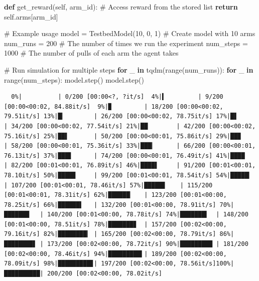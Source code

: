 \documentclass[
  letterpaper,
  DIV=11,
  numbers=noendperiod,
  oneside]{scrartcl}
\newenvironment{Shaded}{\begin{snugshade}}{\end{snugshade}}
\newcommand{\BuiltInTok}[1]{\textcolor[rgb]{0.00,0.23,0.31}{#1}}
\newcommand{\CommentTok}[1]{\textcolor[rgb]{0.37,0.37,0.37}{#1}}
\newcommand{\ControlFlowTok}[1]{\textcolor[rgb]{0.00,0.23,0.31}{\textbf{#1}}}
\newcommand{\DecValTok}[1]{\textcolor[rgb]{0.68,0.00,0.00}{#1}}
\newcommand{\KeywordTok}[1]{\textcolor[rgb]{0.00,0.23,0.31}{\textbf{#1}}}
\newcommand{\NormalTok}[1]{\textcolor[rgb]{0.00,0.23,0.31}{#1}}
\newcommand{\OperatorTok}[1]{\textcolor[rgb]{0.37,0.37,0.37}{#1}}
\newcommand{\VariableTok}[1]{\textcolor[rgb]{0.07,0.07,0.07}{#1}}
\theoremstyle{definition}
\theoremstyle{remark}
\begin{document}
\begin{Shaded}
\begin{Highlighting}[]
    \KeywordTok{def}\NormalTok{ get\_reward(}\VariableTok{self}\NormalTok{, arm\_id):}
        \CommentTok{\# Access reward from the stored list}
        \ControlFlowTok{return} \VariableTok{self}\NormalTok{.arms[arm\_id]}


\CommentTok{\# Example usage}
\NormalTok{model }\OperatorTok{=}\NormalTok{ TestbedModel(}\DecValTok{10}\NormalTok{, }\DecValTok{0}\NormalTok{, }\DecValTok{1}\NormalTok{)  }\CommentTok{\# Create model with 10 arms}
\NormalTok{num\_runs }\OperatorTok{=} \DecValTok{200}                  \CommentTok{\# The number of times we run the experiment}
\NormalTok{num\_steps }\OperatorTok{=} \DecValTok{1000}                \CommentTok{\# The number of pulls of each arm the agent takes}


\CommentTok{\# Run simulation for multiple steps}
\ControlFlowTok{for}\NormalTok{ \_ }\KeywordTok{in}\NormalTok{ tqdm(}\BuiltInTok{range}\NormalTok{(num\_runs)):}
    \ControlFlowTok{for}\NormalTok{ \_ }\KeywordTok{in} \BuiltInTok{range}\NormalTok{(num\_steps):}
\NormalTok{        model.step()}
\NormalTok{    model.step()}
\end{Highlighting}
\end{Shaded}

\begin{verbatim}
  0%|          | 0/200 [00:00<?, ?it/s]  4%|▍         | 9/200 [00:00<00:02, 84.88it/s]  9%|▉         | 18/200 [00:00<00:02, 79.51it/s] 13%|█▎        | 26/200 [00:00<00:02, 78.75it/s] 17%|█▋        | 34/200 [00:00<00:02, 77.54it/s] 21%|██        | 42/200 [00:00<00:02, 75.16it/s] 25%|██▌       | 50/200 [00:00<00:01, 75.86it/s] 29%|██▉       | 58/200 [00:00<00:01, 75.36it/s] 33%|███▎      | 66/200 [00:00<00:01, 76.13it/s] 37%|███▋      | 74/200 [00:00<00:01, 76.49it/s] 41%|████      | 82/200 [00:01<00:01, 76.89it/s] 46%|████▌     | 91/200 [00:01<00:01, 78.10it/s] 50%|████▉     | 99/200 [00:01<00:01, 78.54it/s] 54%|█████▎    | 107/200 [00:01<00:01, 78.46it/s] 57%|█████▊    | 115/200 [00:01<00:01, 78.31it/s] 62%|██████▏   | 123/200 [00:01<00:00, 78.25it/s] 66%|██████▌   | 132/200 [00:01<00:00, 78.91it/s] 70%|███████   | 140/200 [00:01<00:00, 78.78it/s] 74%|███████▍  | 148/200 [00:01<00:00, 78.51it/s] 78%|███████▊  | 157/200 [00:02<00:00, 79.16it/s] 82%|████████▎ | 165/200 [00:02<00:00, 78.79it/s] 86%|████████▋ | 173/200 [00:02<00:00, 78.72it/s] 90%|█████████ | 181/200 [00:02<00:00, 78.46it/s] 94%|█████████▍| 189/200 [00:02<00:00, 78.09it/s] 98%|█████████▊| 197/200 [00:02<00:00, 78.56it/s]100%|██████████| 200/200 [00:02<00:00, 78.02it/s]
\end{verbatim}
\end{document}
